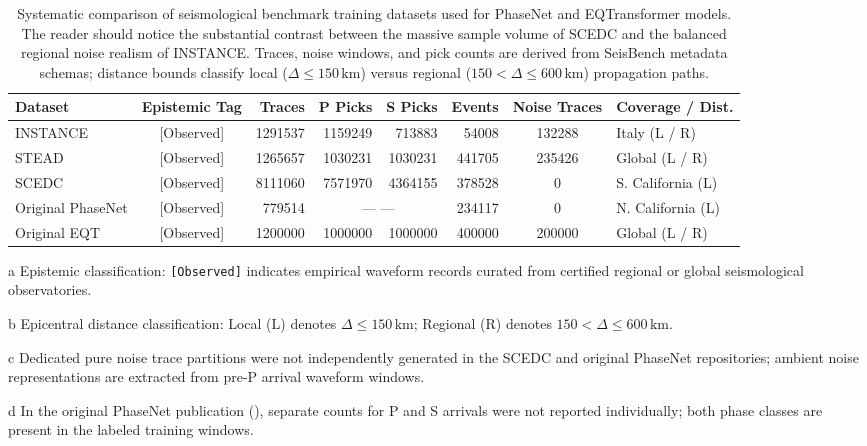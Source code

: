 \begin{table}[htbp]
  \centering
  \small
  \caption{Systematic comparison of seismological benchmark training datasets used for PhaseNet and EQTransformer models. The reader should notice the substantial contrast between the massive sample volume of SCEDC and the balanced regional noise realism of INSTANCE. Traces, noise windows, and pick counts are derived from SeisBench metadata schemas; distance bounds classify local ($\Delta \le 150\,\mathrm{km}$) versus regional ($150 < \Delta \le 600\,\mathrm{km}$) propagation paths.}
  \label{tab:datasets}
  \begin{threeparttable}
    \begin{tabularx}{\linewidth}{l c r r r r c l}
      \toprule
      \textbf{Dataset} & \textbf{Epistemic Tag\tnote{a}} & \textbf{Traces} & \textbf{P Picks} & \textbf{S Picks} & \textbf{Events} & \textbf{Noise Traces} & \textbf{Coverage / Dist.\tnote{b}} \\
      \midrule
      INSTANCE & [Observed] & \num{1291537} & \num{1159249} & \num{713883} & \num{54008} & \num{132288} & Italy (L / R) \\
      STEAD    & [Observed] & \num{1265657} & \num{1030231} & \num{1030231} & \num{441705} & \num{235426} & Global (L / R) \\
      SCEDC    & [Observed] & \num{8111060} & \num{7571970} & \num{4364155} & \num{378528} & 0\tnote{c} & S. California (L) \\
      Original PhaseNet & [Observed] & \num{779514} & \multicolumn{2}{c}{--- \tnote{d} ---} & \num{234117} & 0\tnote{c} & N. California (L) \\
      Original EQT      & [Observed] & \num{1200000} & \num{1000000} & \num{1000000} & \num{400000} & \num{200000} & Global (L / R) \\
      \bottomrule
    \end{tabularx}
    \begin{tablenotes}[flushleft]
      \footnotesize
      \item[a] Epistemic classification: \texttt{[Observed]} indicates empirical waveform records curated from certified regional or global seismological observatories.
      \item[b] Epicentral distance classification: Local ($\mathrm{L}$) denotes $\Delta \le 150\,\mathrm{km}$; Regional ($\mathrm{R}$) denotes $150 < \Delta \le 600\,\mathrm{km}$.
      \item[c] Dedicated pure noise trace partitions were not independently generated in the SCEDC and original PhaseNet repositories; ambient noise representations are extracted from pre-P arrival waveform windows.
      \item[d] In the original PhaseNet publication (\cite{PhaseNet}), separate counts for P and S arrivals were not reported individually; both phase classes are present in the labeled training windows.
    \end{tablenotes}
  \end{threeparttable}
\end{table}

